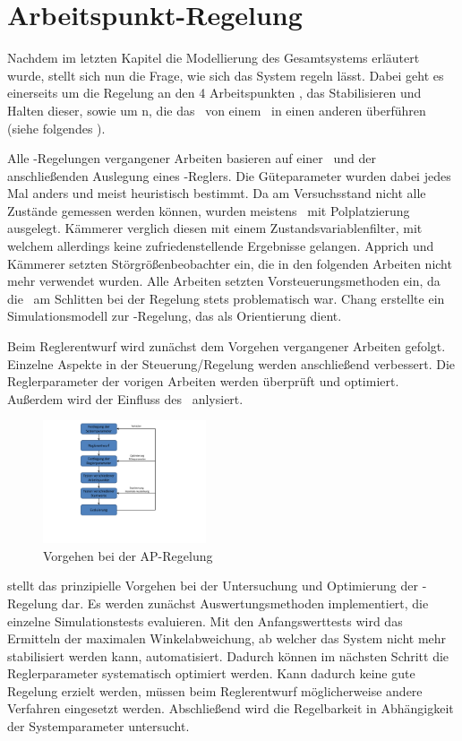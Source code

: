 \chapter{Arbeitspunkt-Regelung}\label{cha:apr}

Nachdem im letzten Kapitel die Modellierung des Gesamtsystems erläutert wurde, stellt sich nun die Frage, wie sich das System regeln lässt. Dabei geht es einerseits um die Regelung an den 4 Arbeitspunkten , \dah das Stabilisieren und Halten dieser, sowie um \traj n, die das \dpd\ von einem \ap\ in einen anderen überführen (siehe folgendes ).

Alle \ap -Regelungen vergangener Arbeiten basieren auf einer \lin\ und der anschließenden Auslegung eines \ricc-Reglers.
Die Güteparameter wurden dabei jedes Mal anders und meist heuristisch bestimmt.
Da am Versuchsstand nicht alle Zustände gemessen werden können, wurden meistens \beob\ mit Polplatzierung ausgelegt.
Kämmerer \cite{kämmerer} verglich diesen mit einem Zustandsvariablenfilter, mit welchem allerdings keine zufriedenstellende Ergebnisse gelangen.
Apprich \cite{apprich} und Kämmerer \cite{kämmerer} setzten Störgrößenbeobachter ein, die in den folgenden Arbeiten nicht mehr verwendet wurden.
Alle Arbeiten setzten Vorsteuerungsmethoden ein, da die \crb\ am Schlitten bei der Regelung stets problematisch war.
Chang \cite{chang} erstellte ein Simulationsmodell zur \ap-Regelung, das als Orientierung dient.

Beim Reglerentwurf wird zunächst dem Vorgehen vergangener Arbeiten gefolgt. 
Einzelne Aspekte in der Steuerung/Regelung werden anschließend verbessert.
Die Reglerparameter der vorigen Arbeiten werden überprüft und optimiert.
Außerdem wird der Einfluss des \beob\ anlysiert.

\begin{figure}[h]
	\centering
		\includegraphics[width=0.43\textwidth]{Bilder/Regelung Vorgehen.pdf}
	\caption{Vorgehen bei der AP-Regelung }
	\label{fig:regvorg}
\end{figure}

 stellt das prinzipielle Vorgehen bei der Untersuchung und Optimierung der \ap-Regelung dar.
Es werden zunächst Auswertungsmethoden implementiert, die einzelne Simulationstests evaluieren.
Mit den Anfangswerttests wird das Ermitteln der maximalen Winkelabweichung, ab welcher das System nicht mehr stabilisiert werden kann, automatisiert.
Dadurch können im nächsten Schritt die Reglerparameter systematisch optimiert werden.
Kann dadurch keine gute Regelung erzielt werden, müssen beim Reglerentwurf möglicherweise andere Verfahren eingesetzt werden.
Abschließend wird die Regelbarkeit in Abhängigkeit der Systemparameter untersucht.

